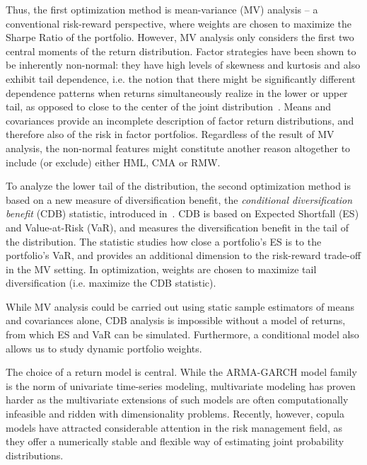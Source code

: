 Thus, the first optimization method is mean-variance (MV) analysis -- a conventional risk-reward perspective, where weights are chosen to maximize the Sharpe Ratio of the portfolio. However, MV analysis only considers the first two central moments of the return distribution. Factor strategies have been shown to be inherently non-normal: they have high levels of skewness and kurtosis and also exhibit tail dependence, i.e. the notion that there might be significantly different dependence patterns when returns simultaneously realize in the lower or upper tail, as opposed to close to the center of the joint distribution~\autocite{ChristoffersenLanglois2013}. Means and covariances provide an incomplete description of factor return distributions, and therefore also of the risk in factor portfolios. Regardless of the result of MV analysis, the non-normal features might constitute another reason altogether to include (or exclude) either HML, CMA or RMW.

To analyze the lower tail of the distribution, the second optimization method is based on a new measure of diversification benefit, the \emph{conditional diversification benefit} (CDB) statistic, introduced in~\textcite{ChristoffersenErrunzaJacobLanglois2012}. CDB is based on Expected Shortfall (ES) and Value-at-Risk (VaR), and measures the diversification benefit in the tail of the distribution. The statistic studies how close a portfolio's ES is to the portfolio's VaR, and provides an additional dimension to the risk-reward trade-off in the MV setting. In optimization, weights are chosen to maximize tail diversification (i.e. maximize the CDB statistic).

While MV analysis could be carried out using static sample estimators of means and covariances alone, CDB analysis is impossible without a model of returns, from which ES and VaR can be simulated. Furthermore, a conditional model also allows us to study dynamic portfolio weights. 

The choice of a return model is central. While the ARMA-GARCH model family is the norm of univariate time-series modeling, multivariate modeling has proven harder as the multivariate extensions of such models are often computationally infeasible and ridden with dimensionality problems. Recently, however, copula models have attracted considerable attention in the risk management field, as they offer a numerically stable and flexible way of estimating joint probability distributions. 

